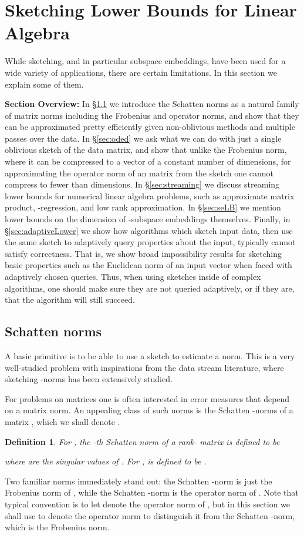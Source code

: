 \documentclass[11pt]{article}
\newtheorem{definition}[theorem]{Definition}
\begin{document}
\section{Sketching Lower Bounds for Linear Algebra}\label{chap:lb}
While sketching, and in particular subspace embeddings, have been used for a wide variety of applications, there
are certain limitations. In this section we explain some of them.

{\bf Section Overview:} In \S\ref{sec:schatten} we introduce the Schatten norms as a natural family of matrix norms including the Frobenius and operator norms, and show that they can be approximated pretty efficiently given non-oblivious methods and multiple passes over the data. In \S\ref{sec:oded} we ask what we can do with just a single oblivious sketch of the data matrix, and show that unlike the Frobenius norm, where it can be compressed to a vector of a constant number of dimensions, for approximating the operator norm of an  matrix from the sketch one cannot compress to fewer than  dimensions. In \S\ref{sec:streaming} we discuss streaming lower bounds for numerical linear algebra problems, such as approximate matrix product, -regression, and low rank approximation. In \S\ref{sec:seLB} we mention lower bounds on the dimension of -subspace embeddings themselves. Finally, in \S\ref{sec:adaptiveLower} we show how algorithms which sketch input data, then use the same sketch to adaptively query properties about the input, typically cannot satisfy correctness. That is, we show broad impossibility results for sketching basic properties such as the Euclidean norm of an input vector when faced with adaptively chosen queries. Thus, when using sketches inside of complex algorithms, one should make sure they are not queried adaptively, or if they are, that the algorithm will still succeed. 

\subsection{Schatten norms}\label{sec:schatten}
A basic primitive is to be able to use a sketch to estimate a norm. This is a very well-studied problem with
inspirations from the data stream literature, where sketching -norms has been extensively studied. 

For problems on matrices one is often interested in error measures that depend on a matrix norm. An 
appealing class of such norms is the Schatten -norms of a matrix , which we shall denote . 
\begin{definition}\label{def:schatten}
For , 
the -th Schatten norm  of a rank- matrix  is defined to be 

where  are the singular values of . For
,  is defined to be . 
\end{definition}
Two familiar norms immediately stand out: the Schatten -norm is just the Frobenius norm of , while
the Schatten -norm is the operator norm of . Note that typical convention is to let
 denote the operator norm of , but in this section we shall use  to denote
the operator norm to distinguish it from the Schatten -norm, which is the Frobenius norm. 
\end{document}
